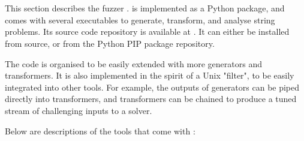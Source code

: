 \section{\fuzzer{}}

    This section describes the fuzzer \fuzzer{}. \fuzzer{} is implemented as a Python package, and comes with several executables to generate, transform, and analyse \smt{} string problems. Its source code repository is available at \sourceRepo{}. It can either be installed from source, or from the Python PIP package repository.

    The \fuzzer{} code is organised to be easily extended with more generators and transformers. It is also implemented in the spirit of a Unix "filter", to be easily integrated into other tools. For example, the outputs of generators can be piped directly into transformers, and transformers can be chained to produce a tuned stream of challenging inputs to a solver.

    Below are descriptions of the tools that come with \fuzzer{}:

